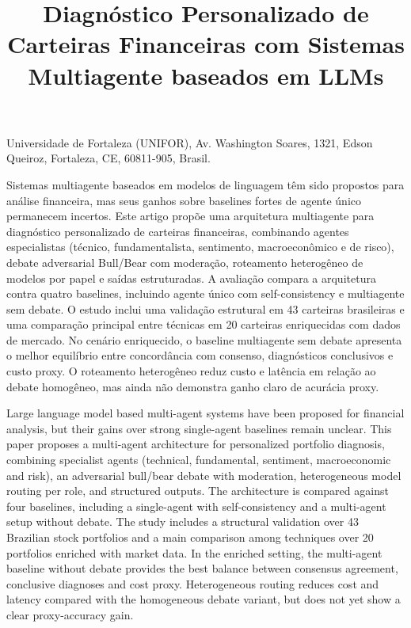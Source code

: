 \documentclass[portuguese]{sbc2025}%
\title[Diagnóstico Personalizado de Carteiras com LLMs Multiagente]{Diagnóstico Personalizado de Carteiras Financeiras com Sistemas Multiagente baseados em LLMs}
\author[Florenzano et al. 202X]{
\affil{\textbf{Rafael Marins Florenzano}~\orcidlink{0009-0003-0347-7795}~\textcolor{blue}{\faEnvelopeO}~~[{Universidade de Fortaleza (UNIFOR)}~|\href{mailto:rafaelmarins2003@gmail.com}{~{\textit{rafaelmarins2003@gmail.com}}}~]}

\affil{\textbf{Rian Maia de Freitas}~\orcidlink{0009-0005-4083-7432}~~[{Universidade de Fortaleza (UNIFOR)}~|\href{mailto:rianmaiaf@gmail.com}{{\textit{rianmaiaf@gmail.com}}}~]}

}
\begin{document}
\begin{frontmatter}

\maketitle

\begin{mail}
Universidade de Fortaleza (UNIFOR), Av. Washington Soares, 1321, Edson Queiroz, Fortaleza, CE, 60811-905, Brasil.
\end{mail}


\begin{abstract-pt}
Sistemas multiagente baseados em modelos de linguagem têm sido propostos
para análise financeira, mas seus ganhos sobre baselines fortes de agente
único permanecem incertos. Este artigo propõe uma arquitetura multiagente
para diagnóstico personalizado de carteiras financeiras, combinando agentes
especialistas (técnico, fundamentalista, sentimento, macroeconômico e de
risco), debate adversarial Bull/Bear com moderação, roteamento heterogêneo
de modelos por papel e saídas estruturadas. A avaliação compara a arquitetura
contra quatro baselines, incluindo agente único com self-consistency e
multiagente sem debate. O estudo inclui uma validação estrutural em 43
carteiras brasileiras e uma comparação principal entre técnicas em 20
carteiras enriquecidas com dados de mercado. No cenário enriquecido, o
baseline multiagente sem debate apresenta o melhor equilíbrio entre
concordância com consenso, diagnósticos conclusivos e custo proxy. O
roteamento heterogêneo reduz custo e latência em relação ao debate
homogêneo, mas ainda não demonstra ganho claro de acurácia proxy.
\end{abstract-pt}

\begin{abstract-en}
Large language model based multi-agent systems have been proposed for
financial analysis, but their gains over strong single-agent baselines
remain unclear. This paper proposes a multi-agent architecture for
personalized portfolio diagnosis, combining specialist agents (technical,
fundamental, sentiment, macroeconomic and risk), an adversarial bull/bear
debate with moderation, heterogeneous model routing per role, and
structured outputs. The architecture is compared against four baselines,
including a single-agent with self-consistency and a multi-agent setup
without debate. The study includes a structural validation over 43 Brazilian
stock portfolios and a main comparison among techniques over 20 portfolios
enriched with market data. In the enriched setting, the multi-agent baseline
without debate provides the best balance between consensus agreement,
conclusive diagnoses and cost proxy. Heterogeneous routing reduces cost and
latency compared with the homogeneous debate variant, but does not yet show a
clear proxy-accuracy gain.
\end{abstract-en}


\end{frontmatter}
\end{document}
